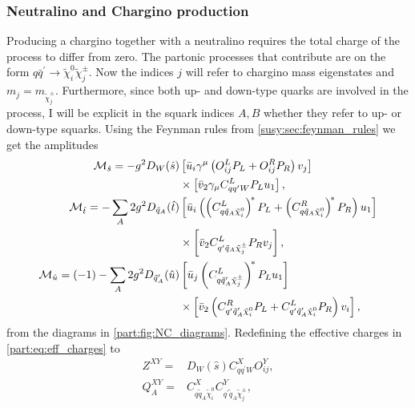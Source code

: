 \documentclass[../main.tex]{subfiles}
\begin{document}
\subsubsection*{Neutralino and Chargino production}
Producing a chargino together with a neutralino requires the total charge of the process to differ from zero.
The partonic processes that contribute are on the form \(q \bar{q}^\prime \to \tilde\chi^0_i \tilde\chi^\pm_j\).
Now the indices \(j\) will refer to chargino mass eigenstates and \(m_j = m_{\tilde\chi^\pm_j}\).
Furthermore, since both up- and down-type quarks are involved in the process, I will be explicit in the squark indices \(A, B\) whether they refer to up- or down-type squarks.
Using the Feynman rules from \cref{susy:sec:feynman_rules} we get the amplitudes
\begin{subequations}
  \begin{align}
    \nonumber
    \M_{\hat{s}} = -g^2 D_W(\hat{s})                                & \bclosed{ \bar{u}_i\gamma^\mu\pclosed{O^{L}_{ij}P_L + O^{R}_{ij}P_R} v_j }
    \\
    \label{part:eq:NC_Ms}
                                                                    & \times \bclosed{ \bar{v}_2 \gamma_\mu C^L_{qq^\prime W}P_L u_1 },
    \\
    \nonumber
    \M_{\hat{t}} = -\sum_A 2g^2 D_{\tilde{q}_A}(\hat{t})            & \bclosed{ \bar{u}_i \pclosed{\pclosed{C_{q \tilde{q}_A \nino[i]}^L}^{\!\ast} P_L + \pclosed{C_{q \tilde{q}_A \nino[i]}^R}^{\!\ast} P_R} u_1 }
    \\
    \label{part:eq:NC_Mt}
                                                                    & \times \bclosed{ \bar{v}_2 C_{q^\prime \tilde{q}_A \tilde\chi^\pm_j}^L P_R v_j },
    \\
    \nonumber
    \M_{\hat{u}} = (-1)-\sum_A 2g^2 D_{\tilde{q}_A^\prime}(\hat{u}) & \bclosed{ \bar{u}_j \pclosed{C_{q \tilde{q}_A^\prime \tilde\chi^\pm_j}^L}^{\!\ast} P_L u_1 }
    \\
    \label{part:eq:NC_Mu}
                                                                    & \times \bclosed{ \bar{v}_2 \pclosed{C_{q^\prime \tilde{q}_A^\prime \nino[i]}^R P_L + C_{q^\prime \tilde{q}_A^\prime \nino[i]}^L P_R} v_i },
  \end{align}
\end{subequations}
from the diagrams in \cref{part:fig:NC_diagrams}.
Redefining the effective charges in \cref{part:eq:eff_charges} to
\begin{subequations}
  \begin{align*}
    Z^{XY} =     & D_W(\hat{s}) C_{qq^\prime W}^X O_{ij}^Y,                                        \\
    Q_{A}^{XY} = & C_{q \tilde{q}_A \tilde\chi^0_i}^X C_{q^\prime \tilde{q}_A \tilde\chi^\pm_j}^Y,
  \end{align*}
\end{subequations}
\end{document}
